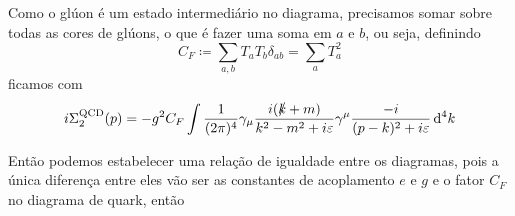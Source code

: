 Como o glúon é um estado intermediário no diagrama, precisamos somar sobre todas as cores de glúons, o que é fazer uma soma em $a$ e $b$, ou seja, definindo 
    \begin{equation*}
        C_{F} \coloneqq \sum_{a,b}T_{a}T_{b}\delta_{ab} = \sum_{a} T_{a}^{2}
    \end{equation*}
ficamos com
    \begin{equation*}
        i\Sigma_{2}^{\text{QCD}}(p) = -g^{2}C_{F}\int\dfrac{1}{(2\pi)^{4}}
        \gamma_{\mu}
        \dfrac{i(\slashed{k} + m)}{k^{2} - m^{2} + i\varepsilon}
        \gamma^{\mu}
        \dfrac{-i}{(p - k)^{2} + i\varepsilon}
        \dd[4]{k}
    \end{equation*}

Então podemos estabelecer uma relação de igualdade entre os diagramas, pois a única diferença entre eles vão ser as constantes de acoplamento $e$ e $g$ e o fator $C_{F}$ no diagrama de quark, então 

\endex